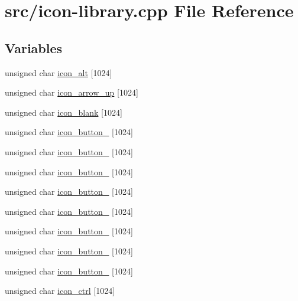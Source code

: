 \hypertarget{icon-library_8cpp}{
\section{src/icon-\/library.cpp File Reference}
\label{icon-library_8cpp}
}
\subsection*{Variables}
\begin{DoxyCompactItemize}
\item 
unsigned char \hyperlink{icon-library_8cpp_a3d87e2c334c64f98986d500164b20c73}{icon\_\-alt} \mbox{[}1024\mbox{]}
\item 
unsigned char \hyperlink{icon-library_8cpp_aa3885d09f33af4fd500f9a5dacc85a1d}{icon\_\-arrow\_\-up} \mbox{[}1024\mbox{]}
\item 
unsigned char \hyperlink{icon-library_8cpp_a398482e126ce2b5920cfcee78bbeab3b}{icon\_\-blank} \mbox{[}1024\mbox{]}
\item 
unsigned char \hyperlink{icon-library_8cpp_a7d25b19d15719c47d6ddac1c16bb3816}{icon\_\-button\_} \mbox{[}1024\mbox{]}
\item 
unsigned char \hyperlink{icon-library_8cpp_a128009fa1268efbbd29245c5b3525fc0}{icon\_\-button\_} \mbox{[}1024\mbox{]}
\item 
unsigned char \hyperlink{icon-library_8cpp_abb96ff6b8c14e99a0c7ca43474fbb72a}{icon\_\-button\_} \mbox{[}1024\mbox{]}
\item 
unsigned char \hyperlink{icon-library_8cpp_a3fe30debc331f148c02f9716be8a3266}{icon\_\-button\_} \mbox{[}1024\mbox{]}
\item 
unsigned char \hyperlink{icon-library_8cpp_a5867e4d91ba53e3e0071382a084349fa}{icon\_\-button\_} \mbox{[}1024\mbox{]}
\item 
unsigned char \hyperlink{icon-library_8cpp_a8b623a158b81e8b5593b133a7f411e2c}{icon\_\-button\_} \mbox{[}1024\mbox{]}
\item 
unsigned char \hyperlink{icon-library_8cpp_a34693e9ff9d5ccb2a376f6050eb77b9d}{icon\_\-button\_} \mbox{[}1024\mbox{]}
\item 
unsigned char \hyperlink{icon-library_8cpp_a7716f73ec2c4737ae5da897c03e84065}{icon\_\-button\_} \mbox{[}1024\mbox{]}
\item 
unsigned char \hyperlink{icon-library_8cpp_aee463345ed72127a3be10acc0d71d40a}{icon\_\-ctrl} \mbox{[}1024\mbox{]}
\item 

\end{DoxyCompactItemize}

